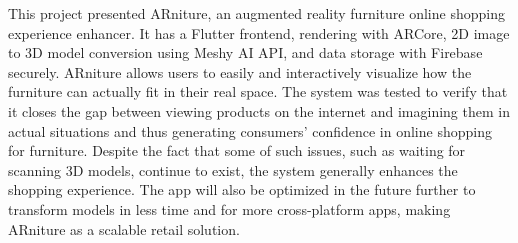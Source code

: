 \documentclass[12pt, a4paper]{article}
\begin{document}
This project presented ARniture, an augmented reality furniture online shopping experience enhancer. It has a Flutter frontend, rendering with ARCore, 2D image to 3D model conversion using Meshy AI API, and data storage with Firebase securely. ARniture allows users to easily and interactively visualize how the furniture can actually fit in their real space. The system was tested to verify that it closes the gap between viewing products on the internet and imagining them in actual situations and thus generating consumers' confidence in online shopping for furniture. Despite the fact that some of such issues, such as waiting for scanning 3D models, continue to exist, the system generally enhances the shopping experience. The app will also be optimized in the future further to transform models in less time and for more cross-platform apps, making ARniture as a scalable retail solution.
\end{document}
